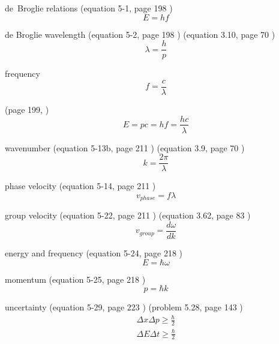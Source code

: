 \documentclass[12pt]{article}  %
\begin{document}
de~Broglie relations (equation 5-1, page 198 \cite{TiplerMP})
\begin{equation}
E = h f
\end{equation}

de Broglie wavelength (equation 5-2, page 198  \cite{TiplerMP}) (equation 3.10, page 70  \cite{LiboffQM})
\begin{equation}
\lambda = \frac{h}{p}
\end{equation}

frequency
\begin{equation}
f = \frac{c}{\lambda}
\end{equation}

(page 199,  \cite{TiplerMP})
\begin{equation}
E = pc = hf = \frac{hc}{\lambda}
\end{equation}

wavenumber (equation 5-13b, page 211  \cite{TiplerMP}) (equation 3.9, page 70  \cite{LiboffQM})
\begin{equation}
k = \frac{2 \pi}{\lambda}
\end{equation}

phase velocity (equation 5-14, page 211 \cite{TiplerMP})
\begin{equation}
v_{phase} = f \lambda
\end{equation}

group velocity (equation 5-22, page 211 \cite{TiplerMP}) (equation 3.62, page 83 \cite{LiboffQM})
\begin{equation}
v_{group} = \frac{d\omega}{dk}
\end{equation}

energy and frequency (equation 5-24, page 218  \cite{TiplerMP})
\begin{equation}
E = \hbar \omega
\end{equation}

momentum (equation 5-25, page 218  \cite{TiplerMP})
\begin{equation}
p = \hbar k
\end{equation}

uncertainty (equation 5-29, page 223  \cite{TiplerMP}) 
(problem 5.28, page 143 \cite{LiboffQM})
\begin{equation}
\begin{gathered}
\Delta x \Delta p \geq \frac{\hbar}{2} \\ 
\Delta E \Delta t \geq \frac{\hbar}{2} 
\end{gathered}
\end{equation}
\end{document}
